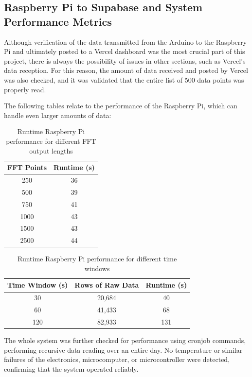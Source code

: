 \subsection{Raspberry Pi to Supabase and System Performance Metrics}
{
	
	Although verification of the data transmitted from the Arduino to the Raspberry Pi and ultimately posted to a Vercel dashboard was the most crucial part of this project, there is always the possibility of issues in other sections, such as Vercel’s data reception. For this reason, the amount of data received and posted by Vercel was also checked, and it was validated that the entire list of 500 data points was properly read.
	
	The following tables relate to the performance of the Raspberry Pi, which can handle even larger amounts of data:
	
	\begin{table}[h!]
		\centering
		\begin{tabular}{|c|c|}
			\hline
			\textbf{FFT Points} & \textbf{Runtime (s)} \\
			\hline
			250   & 36 \\
			500   & 39 \\
			750   & 41 \\
			1000  & 43 \\
			1500  & 43 \\
			2500  & 44 \\
			\hline
		\end{tabular}
		\caption{Runtime Raspberry Pi performance for different FFT output lengths}
		\label{tab:fft_runtime}
	\end{table}
	
	\begin{table}[h!]
		\centering
		\begin{tabular}{|c|c|c|}
			\hline
			\textbf{Time Window (s)} & \textbf{Rows of Raw Data} & \textbf{Runtime (s)} \\
			\hline
			30   & 20,684  & 40  \\
			60   & 41,433  & 68  \\
			120  & 82,933  & 131 \\
			\hline
		\end{tabular}
		\caption{Runtime Raspberry Pi performance for different time windows}
		\label{tab:timewindow_runtime}
	\end{table}
	
	The whole system was further checked for performance using cronjob commands, performing recursive data reading over an entire day. No temperature or similar failures of the electronics, microcomputer, or microcontroller were detected, confirming that the system operated reliably.
	
}
